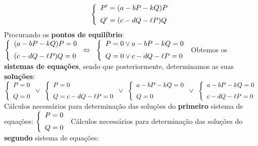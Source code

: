 \begin{equation}
\left\{
\begin{array}{l}
P'=(a-bP-kQ)P  \medskip  \\
Q'=(c-dQ-\ell P)Q
\end{array}
\right.
\label{eq:reduzida}
\end{equation}
\bigskip\medskip\newline\noindent Procurando os \textbf{pontos de equilíbrio}: \bigskip\medskip\newline\noindent
$
\left\{
\begin{array}{l}
(a-bP-kQ)P=0  \medskip  \\
(c-dQ-\ell P)Q=0
\end{array}
\right.
\Leftrightarrow\;\;
\left\{
\begin{array}{l}
P=0 \vee a-bP-kQ=0  \medskip  \\
Q=0 \vee c-dQ-\ell P=0
\end{array}
\right.
$
\bigskip\medskip\newline\noindent Obtemos os \textbf{sistemas de equações}, sendo que posteriormente, determinamos as suas \textbf{soluções}: \bigskip\medskip\newline\noindent
$
\left\{
\begin{array}{l}
P=0  \medskip  \\
Q=0
\end{array}
\right.
\vee\;\;
\left\{
\begin{array}{l}
P=0  \medskip  \\
Q=c-dQ-\ell P=0
\end{array}
\right.
\vee\;\;
\left\{
\begin{array}{l}
a-bP-kQ=0  \medskip  \\
Q=0
\end{array}
\right.
\vee\;\;
\left\{
\begin{array}{l}
a-bP-kQ=0  \medskip  \\
c-dQ-\ell P=0
\end{array}
\right.
$
\bigskip\medskip\newline\noindent Cálculos necessários para determinação das soluções do \textbf{primeiro} sistema de equações:  \bigskip\medskip\newline\noindent
$
\left\{
\begin{array}{l}
P=0  \medskip  \\
Q=0
\end{array}
\right.
$
\bigskip\medskip\newline\noindent Cálculos necessários para determinação das soluções do \textbf{segundo} sistema de equações:  \bigskip\medskip\newline\noindent
